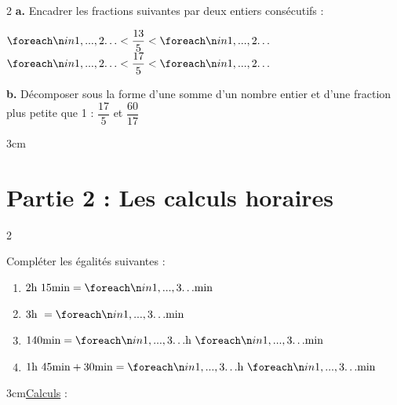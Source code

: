 \documentclass[a4paper]{book}
\begin{document}
{\newpage


    \begin{exerciceNote}{2}    
        \textbf{a.} Encadrer les fractions suivantes par deux entiers consécutifs :

        \medskip
        
        $\points[2] < \dfrac{13}{5} < \points[2]$ \hspace{1cm} $\points[2] < \dfrac{17}{5} < \points[2]$
        
        \textbf{b.} Décomposer sous la forme d'une somme d'un nombre entier et d'une fraction plus petite que 1 : 
            \vspace{0.2cm}
            $\dfrac{17}{5}$ et $\dfrac{60}{17}$

            \begin{ZoneReponse}{3cm}
            \end{ZoneReponse}
    \end{exerciceNote}


\section*{Partie 2 : Les calculs horaires}
    
    \begin{exerciceNote}{2}
        \begin{minipage}{0.40\linewidth}
            Compléter les égalités suivantes :
            \begin{enumerate}
                \item $2\text{h } 15\text{min} = \points[3] \text{min}$
                \item $3\text{h } = \points[3] \text{min}$
                \item $140\text{min} = \points[3]\text{h } \points[3]\text{min}$
                \item $1\text{h } 45\text{min} + 30\text{min} = \points[3]\text{h } \points[3]\text{min}$
            \end{enumerate}
        \end{minipage}
        \hfill
        \begin{minipage}{0.55\linewidth}
            \begin{ZoneReponse}{3cm}\underline{Calculs} :
            \end{ZoneReponse}
        \end{minipage}  
    \end{exerciceNote}
    
}
\end{document}
